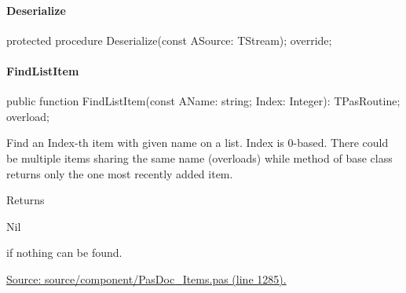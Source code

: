 \documentclass{report}
\newif\ifpdf
\begin{document}
\paragraph*{Deserialize}\hspace*{\fill}

\label{PasDoc_Items.TPasRoutines-Deserialize}
\begin{list}{}{
\setlength{\itemindent}{0cm}
\setlength{\listparindent}{0cm}
\setlength{\leftmargin}{\evensidemargin}
\addtolength{\leftmargin}{\tmplength}
\settowidth{\labelsep}{X}
\addtolength{\leftmargin}{\labelsep}
\setlength{\labelwidth}{\tmplength}
}
\item[\textbf{Declaration}\hfill]
\ifpdf
\begin{flushleft}
\fi
\begin{ttfamily}
protected procedure Deserialize(const ASource: TStream); override;\end{ttfamily}

\ifpdf
\end{flushleft}
\fi

\end{list}
\paragraph*{FindListItem}\hspace*{\fill}

\label{PasDoc_Items.TPasRoutines-FindListItem}
\begin{list}{}{
\setlength{\itemindent}{0cm}
\setlength{\listparindent}{0cm}
\setlength{\leftmargin}{\evensidemargin}
\addtolength{\leftmargin}{\tmplength}
\settowidth{\labelsep}{X}
\addtolength{\leftmargin}{\labelsep}
\setlength{\labelwidth}{\tmplength}
}
\item[\textbf{Declaration}\hfill]
\ifpdf
\begin{flushleft}
\fi
\begin{ttfamily}
public function FindListItem(const AName: string; Index: Integer): TPasRoutine; overload;\end{ttfamily}

\ifpdf
\end{flushleft}
\fi

\par
\item[\textbf{Description}]
Find an Index{-}th item with given name on a list. Index is 0{-}based. There could be multiple items sharing the same name (overloads) while method of base class returns only the one most recently added item.

Returns \begin{ttfamily}Nil\end{ttfamily} if nothing can be found.\par
\href{https://github.com/pasdoc/pasdoc/blob/master/source/component/PasDoc_Items.pas#L1285}{Source: source/component/PasDoc{\_}Items.pas (line 1285).}

\end{list}
\end{document}
